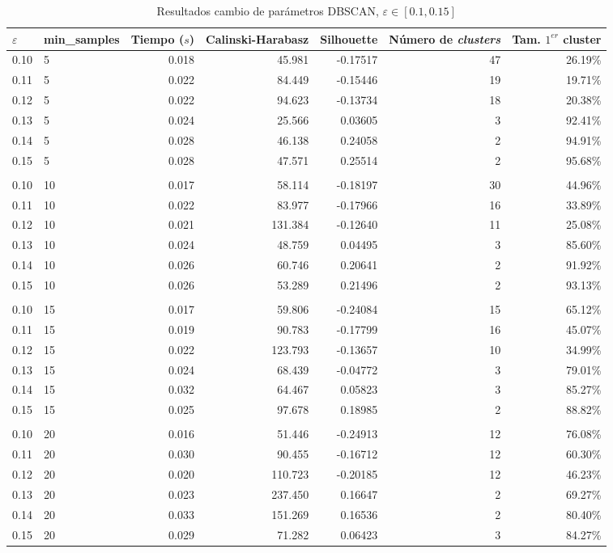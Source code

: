 \documentclass[a4paper, 20pt]{article}
\begin{document}
\begin{table}[H]
\centering
\caption{Resultados cambio de parámetros DBSCAN, $\varepsilon \in [0.1, 0.15]$}
\label{tab:param_dbscan22}
\begin{tabular}{llrrrrr}
\toprule
$\varepsilon$ & min\_samples & Tiempo ($s$) & Calinski-Harabasz & Silhouette & Número de \textit{clusters} & Tam. $1^{er}$ cluster\\
\midrule
0.10 & 5 & 0.018 & 45.981 & -0.17517 & 47 & 26.19\% \\
0.11 & 5 & 0.022 & 84.449 & -0.15446 & 19 & 19.71\% \\
0.12 & 5 & 0.022 & 94.623 & -0.13734 & 18 & 20.38\% \\
0.13 & 5 & 0.024 & 25.566 & 0.03605 & 3 & 92.41\% \\
0.14 & 5 & 0.028 & 46.138 & 0.24058 & 2 & 94.91\% \\
0.15 & 5 & 0.028 & 47.571 & 0.25514 & 2 & 95.68\% \\
\\
0.10 & 10 & 0.017 & 58.114 & -0.18197 & 30 & 44.96\% \\
0.11 & 10 & 0.022 & 83.977 & -0.17966 & 16 & 33.89\% \\
0.12 & 10 & 0.021 & 131.384 & -0.12640 & 11 & 25.08\% \\
0.13 & 10 & 0.024 & 48.759 & 0.04495 & 3 & 85.60\% \\
0.14 & 10 & 0.026 & 60.746 & 0.20641 & 2 & 91.92\% \\
0.15 & 10 & 0.026 & 53.289 & 0.21496 & 2 & 93.13\% \\
\\
0.10 & 15 & 0.017 & 59.806 & -0.24084 & 15 & 65.12\% \\
0.11 & 15 & 0.019 & 90.783 & -0.17799 & 16 & 45.07\% \\
0.12 & 15 & 0.022 & 123.793 & -0.13657 & 10 & 34.99\% \\
0.13 & 15 & 0.024 & 68.439 & -0.04772 & 3 & 79.01\% \\
0.14 & 15 & 0.032 & 64.467 & 0.05823 & 3 & 85.27\% \\
0.15 & 15 & 0.025 & 97.678 & 0.18985 & 2 & 88.82\% \\
\\
0.10 & 20 & 0.016 & 51.446 & -0.24913 & 12 & 76.08\% \\
0.11 & 20 & 0.030 & 90.455 & -0.16712 & 12 & 60.30\% \\
0.12 & 20 & 0.020 & 110.723 & -0.20185 & 12 & 46.23\% \\
0.13 & 20 & 0.023 & 237.450 & 0.16647 & 2 & 69.27\% \\
0.14 & 20 & 0.033 & 151.269 & 0.16536 & 2 & 80.40\% \\
0.15 & 20 & 0.029 & 71.282 & 0.06423 & 3 & 84.27\% \\
\bottomrule
\end{tabular}
\end{table}
\end{document}
